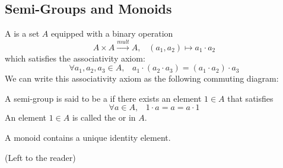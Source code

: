 \documentclass[12pt, a4paper, twoside, openright, titlepage]{book}
\begin{document}
\begin{appendices}
    \section{\textsection Semi-Groups and Monoids}
    
    \begin{defn}{}{}
        A  is a set $A$ equipped with a binary operation \begin{equation}
            A\times A \xrightarrow{mult} A,\;\;\;(a_1,a_2)\mapsto a_1\cdot a_2
        \end{equation}
        which satisfies the associativity axiom:\begin{equation}
            \forall a_1,a_2,a_3 \in A,\;\;\;a_1\cdot (a_2\cdot a_3) = (a_1\cdot a_2)\cdot a_3
        \end{equation}
        We can write this associativity axiom as the following commuting diagram:
        \begin{center}
        \end{center}
    \end{defn}
    
    \begin{defn}{}{}
        A semi-group is said to be a  if there exists an element $1 \in A$ that satisfies \begin{equation}
            \forall a \in A,\;\;\;1\cdot a = a = a \cdot 1
        \end{equation}
        An element $1 \in A$ is called the  or  in $A$.
    \end{defn}
    
    \begin{lem}{}{}
        A monoid contains a unique identity element.
        \begin{proof*}{}{}
            (Left to the reader)
        \end{proof*}
    \end{lem}
    

\end{appendices}
\end{document}

